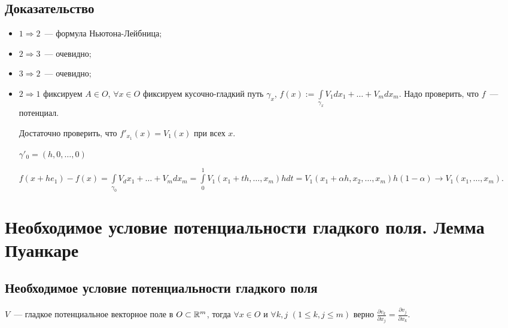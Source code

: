 \documentclass{article}
\begin{document}
        \subsection{Доказательство}
        
            \begin{itemize}
            
                \item $1 \Rightarrow 2$~--- формула Ньютона-Лейбница;
                
                \item $2 \Rightarrow 3$~--- очевидно;
                
                \item $3 \Rightarrow 2$~--- очевидно;
                
                \item $2 \Rightarrow 1$ фиксируем $A \in O$, $\forall x \in O$ фиксируем кусочно-гладкий путь $\gamma_x$, $f(x) := \int\limits_{\gamma_x} V_1 dx_1 + \ldots + V_m dx_m$. Надо проверить, что $f$~--- потенциал.
                
                    Достаточно проверить, что $f'_{x_1}(x) = V_1(x)$ при всех $x$.
                    
                    $\gamma'_0 = (h, 0, \ldots, 0)$
                    
                    $f(x + he_1) - f(x) = \int\limits_{\gamma_0} V_ dx_1 + \ldots + V_m dx_m = \int\limits^1_0 V_1(x_1 + th, \ldots, x_m) h dt = V_1(x_1 + \alpha h, x_2, \ldots, x_m) h (1 - \alpha) \rightarrow V_1(x_1, \ldots, x_m)$.
                    
            \end{itemize}
            
    \newpage
    
    \section{Необходимое условие потенциальности гладкого поля. Лемма Пуанкаре}
    
        \subsection{Необходимое условие потенциальности гладкого поля}
        
            $V$~--- гладкое потенциальное векторное поле в $O \subset \mathbb{R}^m$, тогда $\forall x \in O$ и $\forall k, j$ $(1 \leq k, j \leq m)$ верно $\frac{\partial v_k}{\partial x_j} = \frac{\partial v_j}{\partial x_k}$.
            
\end{document}
